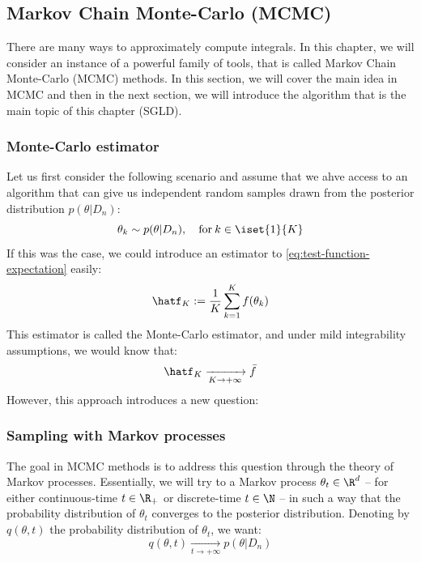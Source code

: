\documentclass[toc, titlepaged]{../cs-classes/cs-classes}
\begin{document}
\subsection{Markov Chain Monte-Carlo (MCMC)}
There are many ways to approximately compute integrals. In this chapter, we will consider an instance of a powerful family of tools, that is called Markov Chain Monte-Carlo (MCMC) methods. In this section, we will cover the main idea in MCMC and then in the next section, we will introduce the algorithm that is the main topic of this chapter (SGLD).

\subsubsection{Monte-Carlo estimator}
Let us first consider the following  scenario and assume that we ahve access to an algorithm that can give us independent random samples drawn from the posterior distribution $p(\theta|D_n)$:
\begin{equation*}
    \theta_k\sim p(\theta|D_n), \quad \textnormal{for} \: k\in\iset{1}{K}
\end{equation*}
If this was the case, we could introduce an estimator to \eqref{eq:test-function-expectation} easily:
\begin{equation}
    \label{eq:monte-carlo-estimator}
    \hatf_K := \frac{1}{K}\sum_{k=1}^K f(\theta_k)
\end{equation}
This estimator is called the Monte-Carlo estimator, and under mild integrability assumptions, we would know that:
\begin{equation*}
    \hatf_K\xrightarrow[K\to+\infty]{}\bar{f}
\end{equation*}
However, this approach introduces a new question: 

\subsubsection{Sampling with Markov processes}
The goal in MCMC methods is to address this question through the theory of Markov processes. Essentially, we will try to  a Markov process $\theta_t\in\R^d$ -- for either continuous-time $t\in\R_+$ or discrete-time $t\in\N$ -- in such a way that the probability distribution of $\theta_t$ converges to the posterior distribution. Denoting by $q(\theta, t)$ the probability distribution of $\theta_t$, we want:
\begin{equation*}
    q(\theta, t) \xrightarrow[t\to+\infty]{} p(\theta|D_n)
\end{equation*}
\end{document}
